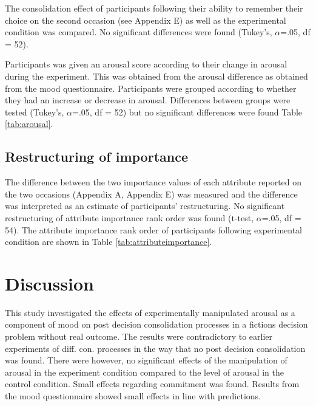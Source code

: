 \documentclass[jou,draftfirst,11pt]{apa6}
\begin{document}
The consolidation effect of participants following their ability to
remember their choice on the second occasion (see Appendix E) as well
as the experimental condition was compared.   No significant
differences were found (Tukey's, $\alpha$=.05, df = 52).

Participants was given an arousal score according to their change in
arousal during the experiment. This was obtained from the arousal
difference as obtained from the mood questionnaire.  Participants were
grouped according to whether they had an increase or decrease in
arousal.  Differences between groups were tested (Tukey's, $\alpha$=.05, df =
52) but no significant differences were found Table \ref{tab:arousal}.


\subsection{Restructuring of importance}

The difference between the two importance values of each attribute
reported on the two occasions (Appendix A, Appendix E) was measured
and the difference was interpreted as an estimate of participants'
restructuring. No significant restructuring  of attribute importance
rank order was found (t-test, $\alpha$=.05, df = 54).  The attribute
importance rank order of participants following experimental condition
are shown in Table \ref{tab:attributeimportance}.


\section{Discussion}

This study investigated the effects of experimentally manipulated
arousal as a component of mood on post decision consolidation
processes in a fictions decision problem without real outcome. The
results were contradictory to earlier experiments of
diff. con. processes in the way that  no post decision consolidation
was found.  There were however, no significant effects of the
manipulation of arousal in the experiment condition compared to the
level of arousal in the control condition.  Small effects regarding
commitment was found.   Results from the mood questionnaire showed
small effects in line with predictions.
\end{document}
